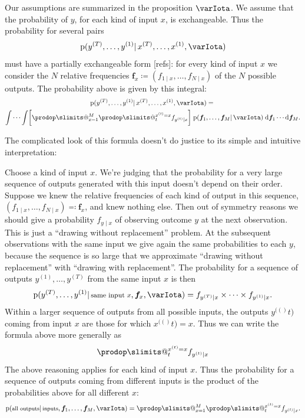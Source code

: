 \documentclass[\ifafour a4paper,12pt,\else a5paper,10pt,\fi%
onecolumn,oneside,article,%
british%
]{memoir}
\makeatletter
\theoremstyle{remark}
\theoremstyle{innote}
\def\prod{\DOTSI\prodop\slimits@}
\newcommand*{\di}{\mathrm{d}}%
\newcommand*{\defd}{\coloneqq}
\newcommand*{\defs}{\eqqcolon}
\newcommand*{\pf}{\mathrm{p}}%
\renewcommand*{\|}{\mathpunct{|}}
\newcommand*{\yI}{\varIota}
\newcommand*{\yf}{\bm{f}}
\newcommand*{\xo}[1]{x^{(#1)}}
\newcommand*{\yo}[1]{y^{(#1)}}
\makeatother
\begin{document}
Our assumptions are summarized in the proposition $\yI$. We assume that the
probability of $y$, for each kind of input $x$, is exchangeable. Thus the
probability for several pairs
\begin{equation}
  \label{eq:prob_several_pairs}
  \pf(\yo{T},\dotsc, \yo{1} \|\xo{T}, \dotsc, \xo{1}, \yI)
\end{equation}
must have a partially exchangeable form [refs]: for every kind of input
$x$ we consider the $N$ relative frequencies
$\yf_x \defd (f_{1\|x},\dotsc, f_{N\|x})$ of the $N$ possible outputs. The
probability above is given by this integral:
\begin{multline}
  \label{eq:prob_several_pairs_exch}
  \pf(\yo{T},\dotsc, \yo{1} \|\xo{T}, \dotsc, \xo{1}, \yI)
  ={}\\
  \idotsint
  \biggl[ \prod_{x=1}^M \prod_t^{\xo{t}=x} f_{\yo{t}\|x} \biggr]
  \;
  \pf(\yf_1,\dotsc,\yf_M \| \yI)
  \;\di\yf_1 \dotsm \di\yf_M.
\end{multline}

The complicated look of this formula doesn't do justice to its simple and
intuitive interpretation:

Choose a kind of input $x$. We're judging that the probability for a very
large sequence of outputs generated with this input doesn't depend on their
order. Suppose we knew the relative frequencies of each kind of output in
this sequence, $(f_{1\|x},\dotsc,f_{N\|x}) \defs \yf_x$, and knew nothing
else. Then out of symmetry reasons we should give a probability $f_{y\|x}$
of observing outcome $y$ at the next observation. This is just a
\enquote{drawing without replacement} problem. At the subsequent
observations with the same input we give again the same probabilities to
each $y$, because the sequence is so large that we approximate
\enquote{drawing without replacement} with \enquote{drawing with
  replacement}. The probability for a sequence of outputs
$\yo{1},\dotsc,\yo{T}$ from the same input $x$ is then
\begin{equation}
  \pf(\yo{T}, \dotsc,\yo{1}\|\text{\footnotesize same input $x$},\yf_x, \yI) =
  f_{\yo{T}\|x}\times\dotsm\times f_{\yo{1}\|x}.
  \label{eq:input_m_indep_output}
\end{equation}
Within a larger sequence of outputs from all possible inputs, the outputs
$\yo(t)$ coming from input $x$ are those for which $\xo(t)=x$. Thus we can
write the formula above more generally as
\begin{equation}
 \prod_t^{\xo{t}=x} f_{\yo{t}\|x}
  \label{eq:input_m_indep_output_label_x}
\end{equation}
The above reasoning applies for each kind of input $x$. Thus the
probability for a sequence of outputs coming from different inputs is the
product of the probabilities above for all different $x$:
\begin{equation}
  \pf(\text{\footnotesize all outputs} \|\text{\footnotesize inputs}, \yf_1,\dotsc,\yf_M, \yI) =
\prod_{x=1}^M \prod_t^{\xo{t}=x} f_{\yo{t}\|x}.
  \label{eq:input_m_indep_output_all_x}
\end{equation}
\end{document}

